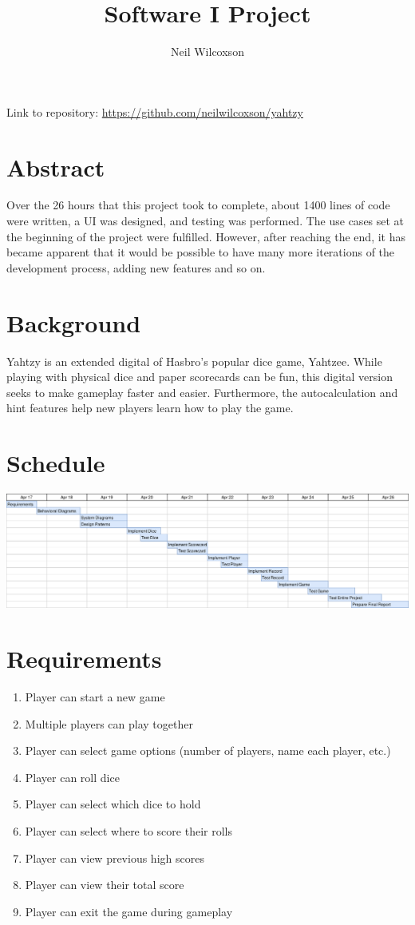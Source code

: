 \documentclass[12pt]{article}
\title{Software I Project}
\author{Neil Wilcoxson}
\begin{document}
\maketitle 

\noindent Link to repository: \newline
\url{https://github.com/neilwilcoxson/yahtzy}

\section*{Abstract}

Over the 26 hours that this project took to complete, about 1400 lines of code were written, a UI was designed, and testing was performed.  The use cases set at the beginning of the project were fulfilled.  However, after reaching the end, it has became apparent that it would be possible to have many more iterations of the development process, adding new features and so on.

\section*{Background}
Yahtzy is an extended digital of Hasbro's popular dice game, Yahtzee.  While playing with physical dice and paper scorecards can be fun, this digital version seeks to make gameplay faster and easier.  Furthermore, the autocalculation and hint features help new players learn how to play the game.

\section*{Schedule}
\includegraphics[scale=.21]{diagrams/gnatt.png}

\newpage
\section*{Requirements}
\begin{enumerate}
	\item Player can start a new game
	\item Multiple players can play together
	\item Player can select game options (number of players, name each player, etc.)
	\item Player can roll dice
	\item Player can select which dice to hold
	\item Player can select where to score their rolls
	\item Player can view previous high scores
	\item Player can view their total score
	\item Player can exit the game during gameplay

\end{enumerate}
\end{document}
